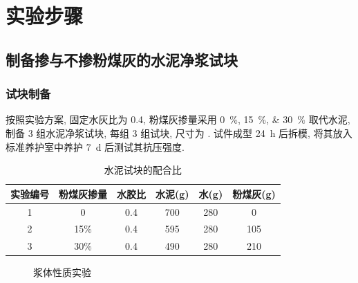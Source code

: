
\section{实验步骤}

\subsection{制备掺与不掺粉煤灰的水泥净浆试块}

\subsubsection{试块制备}
按照实验方案, 固定水灰比为 \num{0.4}, 粉煤灰掺量采用 \qtylist{0; 15; 30}{\percent} 取代水泥, 制备 3 组水泥净浆试块, 每组 3 组试块, 尺寸为 .
试件成型 \SI{24}{\hour} 后拆模, 将其放入标准养护室中养护 \SI{7}{\day} 后测试其抗压强度.

\begin{table}
  \centering
  \caption{水泥试块的配合比}
  \begin{tabular}{|c|c|c|c|c|c|}
    \hline
    实验编号 & 粉煤灰掺量 & 水胶比 & 水泥(g) & 水(g) & 粉煤灰(g) \\ \hline
    1        & 0          & 0.4    & 700     & 280   & 0         \\ \hline
    2        & 15\%       & 0.4    & 595     & 280   & 105       \\ \hline
    3        & 30\%       & 0.4    & 490     & 280   & 210       \\ \hline
  \end{tabular}\label{tab:proportion}
\end{table}

\begin{figure}
  \centering
  \quad
  \caption{浆体性质实验}
\end{figure}

